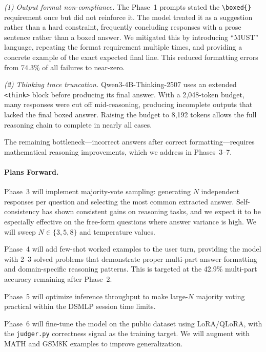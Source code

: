 \documentclass{article}
\begin{document}
\textit{(1) Output format non-compliance.} The Phase~1 prompts stated the \texttt{\textbackslash boxed\{\}} requirement once but did not reinforce it. The model treated it as a suggestion rather than a hard constraint, frequently concluding responses with a prose sentence rather than a boxed answer. We mitigated this by introducing ``MUST'' language, repeating the format requirement multiple times, and providing a concrete example of the exact expected final line. This reduced formatting errors from 74.3\% of all failures to near-zero.

\textit{(2) Thinking trace truncation.} Qwen3-4B-Thinking-2507 uses an extended \texttt{<think>} block before producing its final answer. With a 2,048-token budget, many responses were cut off mid-reasoning, producing incomplete outputs that lacked the final boxed answer. Raising the budget to 8,192 tokens allows the full reasoning chain to complete in nearly all cases.

The remaining bottleneck—incorrect answers after correct formatting—requires mathematical reasoning improvements, which we address in Phases~3--7.

\paragraph{Plans Forward.}
Phase~3 will implement majority-vote sampling: generating $N$ independent responses per question and selecting the most common extracted answer. Self-consistency \citep{wang2022selfconsistency} has shown consistent gains on reasoning tasks, and we expect it to be especially effective on the free-form questions where answer variance is high. We will sweep $N \in \{3, 5, 8\}$ and temperature values.

Phase~4 will add few-shot worked examples to the user turn, providing the model with 2--3 solved problems that demonstrate proper multi-part answer formatting and domain-specific reasoning patterns. This is targeted at the 42.9\% multi-part accuracy remaining after Phase~2.

Phase~5 will optimize inference throughput to make large-$N$ majority voting practical within the DSMLP session time limits.

Phase~6 will fine-tune the model on the public dataset using LoRA/QLoRA, with the \texttt{judger.py} correctness signal as the training target. We will augment with MATH \citep{hendrycks2021math} and GSM8K \citep{cobbe2021gsm8k} examples to improve generalization.
\end{document}
